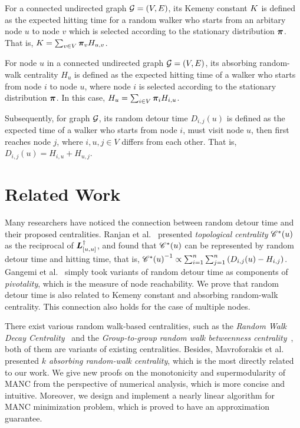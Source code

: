 \documentclass[sigconf]{acmart}
\begin{document}
For a connected undirected graph \(\mathcal{G}=(V,E)\), its Kemeny constant \(K\) is defined as the expected hitting time for a random walker who starts from an arbitary node \(u\) to node \(v\) which is selected according to the stationary distribution \(\boldsymbol{\pi}\).
That is, \(K=\sum_{v\in V}\boldsymbol{\pi}_vH_{u,v}\).

For node \(u\) in a connected undirected graph \(\mathcal{G}=(V,E)\), its absorbing random-walk centrality \(H_u\) is defined as the expected hitting time of a walker who starts from node \(i\) to node \(u\), where node \(i\) is selected according to the stationary distribution \(\boldsymbol{\pi}\).
In this case, \(H_u=\sum_{i\in V}\boldsymbol{\pi}_iH_{i,u}\).

Subsequently, for graph \(\mathcal{G}\), its random detour time \(D_{i,j}(u)\) is defined as the expected time of a walker who starts from node \(i\), must visit node \(u\), then first reaches node \(j\), where \(i,u,j\in V\) differs from each other.
That is, \(D_{i,j}(u)= H_{i,u}+H_{u,j}\).

\section{Related Work}

Many researchers have noticed the connection between random detour time and their proposed centralities.
Ranjan et al.~\cite{RaZh13} presented \textit{topological centrality} \(\mathscr{C}^*(u)\) as the reciprocal of \(\boldsymbol{L}^\dagger_{[u,u]}\), and found that \(\mathscr{C}^*(u)\) can be represented by random detour time and hitting time, that is, \({\mathscr{C}^*(u)}^{-1}\propto \sum_{i=1}^n\sum_{j=1}^n\left( D_{i,j}(u)-H_{i,j} \right)\).
Gangemi et al.~\cite{GaLePaGoLiZh15} simply took variants of random detour time as components of \textit{pivotality}, which is the measure of node reachability.
We prove that random detour time is also related to Kemeny constant and absorbing random-walk centrality.
This connection also holds for the case of multiple nodes.

There exist various random walk-based centralities, such as the \textit{Random Walk Decay Centrality}~\cite{WaRaSk19} and the \textit{Group-to-group random walk betweenness centrality}~\cite{GiBaRa21}, both of them are variants of existing centralities.
Besides, Mavroforakis et al.~\cite{MaMaGi15} presented \textit{\(k\) absorbing random-walk centrality}, which is the most directly related to our work.
We give new proofs on the monotonicity and supermodularity of MANC from the perspective of numerical analysis, which is more concise and intuitive.
Moreover, we design and implement a nearly linear algorithm for MANC minimization problem, which is proved to have an approximation guarantee.
\end{document}
